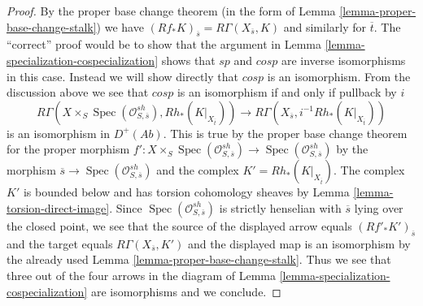\documentclass[10pt,a4paper]{amsart}
\theoremstyle{plain}
\theoremstyle{definition}
\theoremstyle{remark}
\numberwithin{equation}{subsection}
\def\Spec{\mathop{\mathrm{Spec}}}
\begin{document}
\begin{proof}
By the proper base change theorem (in the form of
Lemma \ref{lemma-proper-base-change-stalk}) we have
$(Rf_*K)_{\overline{s}} = R\Gamma(X_{\overline{s}}, K)$
and similarly for $\overline{t}$. The ``correct'' proof would be
to show that the argument in
Lemma \ref{lemma-specialization-cospecialization}
shows that $sp$ and $cosp$ are inverse isomorphisms in this case.
Instead we will show directly that $cosp$ is an isomorphism.
From the discussion above we see that $cosp$ is an isomorphism
if and only if pullback by $i$
$$
R\Gamma(X \times_S \Spec(\mathcal{O}^{sh}_{S, \overline{s}}),
Rh_*(K|_{X_{\overline{t}}}))
\longrightarrow
R\Gamma(X_{\overline{s}}, i^{-1}Rh_*(K|_{X_{\overline{t}}}))
$$
is an isomorphism in $D^+(\textit{Ab})$. This is true by the proper
base change theorem for the proper morphism
$f' : X \times_S \Spec(\mathcal{O}^{sh}_{S, \overline{s}}) \to
\Spec(\mathcal{O}^{sh}_{S, \overline{s}})$
by the morphism $\overline{s} \to \Spec(\mathcal{O}^{sh}_{S, \overline{s}})$
and the complex $K' = Rh_*(K|_{X_{\overline{t}}})$. The complex
$K'$ is bounded below and has torsion cohomology sheaves
by Lemma \ref{lemma-torsion-direct-image}.
Since $\Spec(\mathcal{O}^{sh}_{S, \overline{s}})$ is strictly henselian
with $\overline{s}$ lying over the closed point,
we see that the source of the displayed arrow equals
$(Rf'_*K')_{\overline{s}}$ and the target equals
$R\Gamma(X_{\overline{s}}, K')$ and the displayed map is an isomorphism
by the already used
Lemma \ref{lemma-proper-base-change-stalk}.
Thus we see that three out of the four arrows in the diagram
of Lemma \ref{lemma-specialization-cospecialization} are isomorphisms
and we conclude.
\end{proof}
\end{document}
